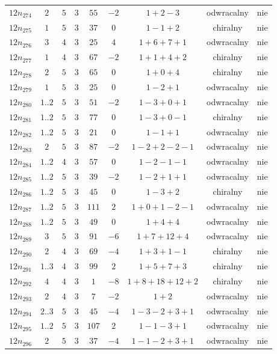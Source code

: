 \begin{longtable}{ccccccccc}
$12n_{274}$ & $2$ & $5$ & $3$ & $55$ & $-2$ & $1+2-3$ & odwracalny & nie \\
$12n_{275}$ & $1$ & $5$ & $3$ & $37$ & $0$ & $1-1+2$ & chiralny & nie \\
$12n_{276}$ & $3$ & $4$ & $3$ & $25$ & $4$ & $1+6+7+1$ & odwracalny & nie \\
$12n_{277}$ & $1$ & $4$ & $3$ & $67$ & $-2$ & $1+1+4+2$ & chiralny & nie \\
$12n_{278}$ & $2$ & $5$ & $3$ & $65$ & $0$ & $1+0+4$ & chiralny & nie \\
$12n_{279}$ & $1$ & $5$ & $3$ & $25$ & $0$ & $1-2+1$ & odwracalny & nie \\
$12n_{280}$ & $1..2$ & $5$ & $3$ & $51$ & $-2$ & $1-3+0+1$ & odwracalny & nie \\
$12n_{281}$ & $1..2$ & $5$ & $3$ & $77$ & $0$ & $1-3+0-1$ & chiralny & nie \\
$12n_{282}$ & $1..2$ & $5$ & $3$ & $21$ & $0$ & $1-1+1$ & odwracalny & nie \\
$12n_{283}$ & $2$ & $5$ & $3$ & $87$ & $-2$ & $1-2+2-2-1$ & odwracalny & nie \\
$12n_{284}$ & $1..2$ & $4$ & $3$ & $57$ & $0$ & $1-2-1-1$ & odwracalny & nie \\
$12n_{285}$ & $1..2$ & $5$ & $3$ & $39$ & $-2$ & $1-2+1+1$ & odwracalny & nie \\
$12n_{286}$ & $1..2$ & $5$ & $3$ & $45$ & $0$ & $1-3+2$ & chiralny & nie \\
$12n_{287}$ & $1..2$ & $5$ & $3$ & $111$ & $2$ & $1+0+1-2-1$ & odwracalny & nie \\
$12n_{288}$ & $1..2$ & $5$ & $3$ & $49$ & $0$ & $1+4+4$ & odwracalny & nie \\
$12n_{289}$ & $3$ & $5$ & $3$ & $91$ & $-6$ & $1+7+12+4$ & odwracalny & nie \\
$12n_{290}$ & $2$ & $4$ & $3$ & $69$ & $-4$ & $1+3+1-1$ & chiralny & nie \\
$12n_{291}$ & $1..3$ & $4$ & $3$ & $99$ & $2$ & $1+5+7+3$ & chiralny & nie \\
$12n_{292}$ & $4$ & $4$ & $3$ & $1$ & $-8$ & $1+8+18+12+2$ & chiralny & nie \\
$12n_{293}$ & $2$ & $4$ & $3$ & $7$ & $-2$ & $1+2$ & odwracalny & nie \\
$12n_{294}$ & $2..3$ & $5$ & $3$ & $45$ & $-4$ & $1-3-2+3+1$ & odwracalny & nie \\
$12n_{295}$ & $1..2$ & $5$ & $3$ & $107$ & $2$ & $1-1-3+1$ & odwracalny & nie \\
$12n_{296}$ & $2$ & $5$ & $3$ & $37$ & $-4$ & $1-1-2+3+1$ & odwracalny & nie \\

\end{longtable}
